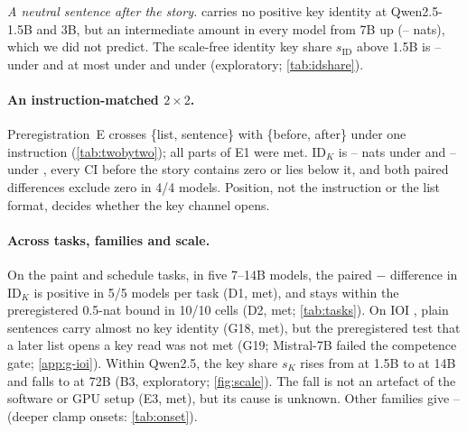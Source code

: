 \emph{A neutral sentence after the story.} \fmtPost{} carries no positive key identity at Qwen2.5-1.5B and 3B, but an intermediate amount in every model from 7B up (\idKPostOlmoSeven{}--\idKPostQwenFourteen{} nats), which we did not predict. The scale-free identity key share $s_{\mathrm{ID}}$ above 1.5B is \idShareOptMinNoOnefive{}--\idShareOptMax{} under \fmtOpt{} and at most \idSharePostMax{} under \fmtPost{} and \idShareNoneMax{} under \fmtNone{} (exploratory; \cref{tab:idshare}).

\begin{table}[!ht]
  \centering
  \caption{\textbf{Position decides the key read} (discovery sample: the stories of stages 1 and 3b). The same list or neutral sentence, after or before the story, with ``Answer with one word''; \fmtNone{} for reference. $\mathrm{ID}_K$ (nats, 95\% CIs), $n = 150$, keys clamped from layer~0. Preregistration~E (E1).}
  \label{tab:twobytwo}
  {\footnotesize\setlength{\tabcolsep}{4pt}}
\end{table}

\paragraph{An instruction-matched $2{\times}2$.}
Preregistration~E crosses \{list, sentence\} with \{before, after\} under one instruction (\cref{tab:twobytwo}); all parts of E1 were met. $\mathrm{ID}_K$ is \twoAfterMin{}--\twoAfterMax{} nats under \fmtListA{} and \twoPostMin{}--\twoPostMax{} under \fmtPost{}, every CI before the story contains zero or lies below it, and both paired differences exclude zero in 4/4 models. Position, not the instruction or the list format, decides whether the key channel opens.

\paragraph{Across tasks, families and scale.}
On the paint and schedule tasks, in five 7--14B models, the paired \fmtOpt{}$-$\fmtNone{} difference in $\mathrm{ID}_K$ is positive in 5/5 models per task (D1, met), and \fmtBefore{} stays within the preregistered 0.5-nat bound in 10/10 cells (D2, met; \cref{tab:tasks}). On IOI \citep{wang2022ioi}, plain sentences carry almost no key identity (G18, met), but the preregistered test that a later list opens a key read was not met (G19; Mistral-7B failed the competence gate; \cref{app:g-ioi}). Within Qwen2.5, the \fmtOpt{} key share $s_K$ rises from \shareQwenOnefive{} at 1.5B to \shareQwenFourteen{} at 14B and falls to \shareQwenSeventytwo{} at 72B (B3, exploratory; \cref{fig:scale}). The fall is not an artefact of the software or GPU setup (E3, met), but its cause is unknown. Other families give \shareOlmoSeven{}--\shareMistralSeven{} (deeper clamp onsets: \cref{tab:onset}).

